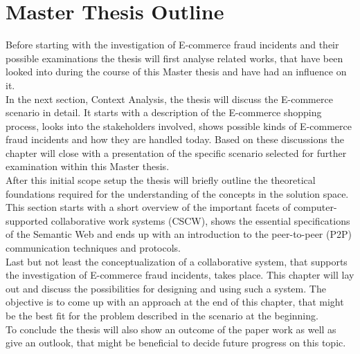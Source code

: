 
\section{Master Thesis Outline}
\label{sec:thesis_outline}

Before starting with the investigation of E-commerce fraud incidents and their possible examinations the thesis will first analyse related works, that have been looked into during the course of this Master thesis and have had an influence on it. \\

In the next section, Context Analysis, the thesis will discuss the E-commerce scenario in detail. It starts with a description of the E-commerce shopping process, looks into the stakeholders involved, shows possible kinds of E-commerce fraud incidents and how they are handled today. Based on these discussions the chapter will close with a presentation of the specific scenario selected for further examination within this Master thesis. \\

After this initial scope setup the thesis will briefly outline the theoretical foundations required for the understanding of the concepts in the solution space. This section starts with a short overview of the important facets of computer-supported collaborative work systems (\gls{CSCW}), shows the essential  specifications of the Semantic Web and ends up with an introduction to the peer-to-peer (\gls{P2P}) communication techniques and protocols. \\

Last but not least the conceptualization of a collaborative system, that supports the investigation of E-commerce fraud incidents, takes place. This chapter will lay out and discuss the possibilities for designing and using such a system. The objective is to come up with an approach at the end of this chapter, that might be the best fit for the problem described in the scenario at the beginning. \\

To conclude the thesis will also show an outcome of the paper work as well as give an outlook, that might be beneficial to decide future progress on this topic.

